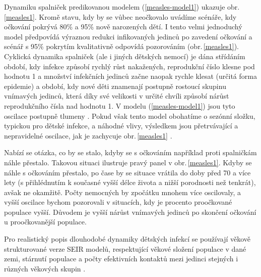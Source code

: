 Dynamiku spalniček predikovanou modelem (\ref{measles-model1}) ukazuje obr.\,\ref{measles1}. Kromě stavu, kdy by se vůbec neočkovalo uvádíme scénáře, kdy očkování pokrývá 80\% a 95\% nově narozených dětí. I tento velmi jednoduchý model předpovídá výraznou redukci infikovaných jedinců po zavedení očkování a scénář s 95\% pokrytím kvalitativně odpovídá pozorováním (obr.\,\ref{measles1}). Cyklická dynamika spalniček (ale i jiných dětských nemocí) je dána střídáním období, kdy infekce způsobí rychlý růst nakažených, reprodukční číslo klesne pod hodnotu 1 a množství infekčních jedinců začne naopak rychle klesat (určitá forma epidemie) a období, kdy nové děti znamenají postupně rostoucí skupinu vnímavých jedinců, která díky své velikosti v určité chvíli způsobí nárůst reprodukčního čísla nad hodnotu 1. V modelu (\ref{measles-model1}) jsou tyto oscilace postupně tlumeny \cite{KeelingRohani2008}. Pokud však tento model obohatíme o sezónní složku, typickou pro dětské infekce, a náhodné vlivy, výsledkem jsou přetrvávající a nepravidelné oscilace, jak je zachycuje obr.\,\ref{measles1} \cite{KeelingRohani2008}. 

Nabízí se otázka, co by se stalo, kdyby se s očkováním například proti spalničkám náhle přestalo. Takovou situaci ilustruje pravý panel v obr.\,\ref{measles1}. Kdyby se náhle s očkováním přestalo, po čase by se situace vrátila do doby před 70 a více lety (s přihlédnutím k současné vyšší délce života a nižší porodnosti než tenkrát), avšak ne okamžitě. Počty nemocných by zpočátku mnohem více oscilovaly, a vyšší oscilace bychom pozorovali v situacích, kdy je procento proočkované populace vyšší. Důvodem je vyšší nárůst vnímavých jedinců po skončení očkování u proočkovanější populace. 


Pro realistický popis dlouhodobé dynamiky dětských infekcí se používají věkově strukturované verze SEIR modelů, respektující věkové složení populace v dané zemi, stárnutí populace a počty efektivních kontaktů mezi jedinci stejných i různých věkových skupin \cite{KeelingRohani2008,VynnyckyWhite2010}.

